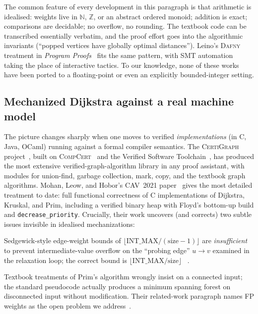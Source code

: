 \documentclass[11pt,a4paper]{article}
\makeatletter
\let\enitfb@enumerate\enumerate
\let\enitfb@endenumerate\endenumerate
\renewenvironment{enumerate}[1][]{\enitfb@enumerate}{\enitfb@endenumerate}%
\newcommand{\Dijkstra}{Dijkstra\xspace}
\newcommand{\code}[1]{\texttt{#1}}
\theoremstyle{plain}
\theoremstyle{definition}
\makeatother
\begin{document}
The common feature of every development in this paragraph is that
arithmetic is idealised: weights live in $\mathbb{N}$, $\mathbb{Z}$, or an
abstract ordered monoid; addition is exact; comparisons are decidable; no
overflow, no rounding. The textbook code can be transcribed essentially
verbatim, and the proof effort goes into the algorithmic invariants
(``popped vertices have globally optimal distances''). Leino's
\textsc{Dafny} treatment in \emph{Program Proofs}~\cite{Leino2023ProgramProofs}
fits the same pattern, with SMT automation taking the place of interactive
tactics. To our knowledge, none of these works have been ported to a
floating-point or even an explicitly bounded-integer setting.

\subsection{Mechanized \Dijkstra{} against a real machine model}\label{sec:rel-real}

The picture changes sharply when one moves to verified
\emph{implementations} (in C, Java, OCaml) running against a formal compiler
semantics. The \textsc{CertiGraph} project~\cite{WangCaoMohanHobor2019,Wang2019Thesis},
built on \textsc{CompCert}~\cite{Leroy2009CompCert} and the
Verified Software Toolchain~\cite{AppelVST2011}, has produced the most
extensive verified-graph-algorithm library in any proof assistant, with
modules for union-find, garbage collection, mark, copy, and the textbook
graph algorithms. Mohan, Leow, and Hobor's CAV~2021 paper~\cite{MohanLeowHobor2021}
gives the most detailed treatment to date: full functional correctness of C
implementations of \Dijkstra, Kruskal, and Prim, including a verified binary
heap with Floyd's bottom-up build and \code{decrease\_priority}. Crucially,
their work uncovers (and corrects) two subtle issues invisible in idealised
mechanizations:
\begin{enumerate}[leftmargin=1.6em,itemsep=0.25em]
\item Sedgewick-style edge-weight bounds of $\lfloor \mathrm{INT\_MAX}/(\mathrm{size}-1)\rfloor$ are
      \emph{insufficient} to prevent intermediate-value overflow on the
      ``probing edge'' $u \rightarrow v$ examined in the relaxation loop;
      the correct bound is $\lfloor \mathrm{INT\_MAX}/\mathrm{size}\rfloor$
      ~\cite[Fig.~2]{MohanLeowHobor2021}.
\item Textbook treatments of Prim's algorithm wrongly insist on a connected
      input; the standard pseudocode actually produces a minimum spanning
      forest on disconnected input without modification.
\end{enumerate}
Their related-work paragraph names FP weights as the open problem we
address~\cite[\S 3.3]{MohanLeowHobor2021}.
\end{document}
